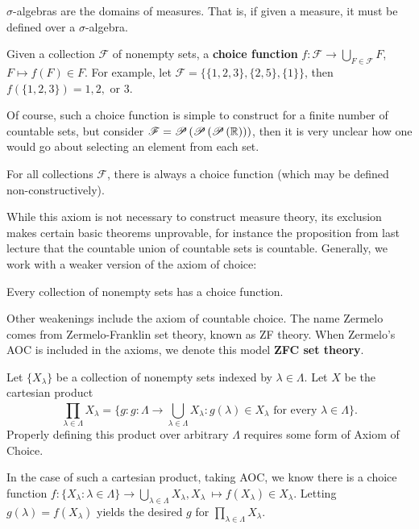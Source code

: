 \begin{remark}
	$\sigma$-algebras are the domains of measures. That is, if given a measure, it must be defined over a $\sigma$-algebra.
\end{remark}
\begin{definition}
	Given a collection $\mathscr{F}$ of nonempty sets, a \textbf{choice function}  $ f: \mathscr{F} \to \bigcup_{F \in \mathscr{F}}F $, $F \mapsto f(F) \in F $. For example, let $\mathscr{F}= \{\{1,2,3\}, \{2, 5\}, \{1\}\} $, then $f\left( \{1, 2, 3\}  \right) = 1, 2, \text{ or } 3$.
\end{definition}
Of course, such a choice function is simple to construct for a finite number of countable sets, but consider $\mathscr{F}= \mathscr{P}\left( \mathscr{P}\left( \mathscr{P}\left( \mathbb{R} \right)  \right)  \right) $, then it is very unclear how one would go about selecting an element from each set.
\begin{law}
	For all collections $\mathscr{F}$, there is always a choice function (which may be defined non-constructively).
\end{law}
While this axiom is not necessary to construct measure theory, its exclusion makes certain basic theorems unprovable, for instance the proposition from last lecture that the countable union of countable sets is countable. Generally, we work with a weaker version of the axiom of choice:
\begin{law}
Every collection of nonempty sets has a choice function.
\end{law}
Other weakenings include the axiom of countable choice. The name Zermelo comes from Zermelo-Franklin set theory, known as ZF theory. When Zermelo's AOC is included in the axioms, we denote this model \textbf{ZFC set theory}.
\begin{proposition}
	Let \(\{X_{\lambda}\} \) be a collection of nonempty sets indexed by \(\lambda \in \Lambda\). Let \(X\) be the cartesian product \[\prod_{\lambda \in \Lambda}^{}  X_{\lambda} = \{g : g: \Lambda \to \bigcup_{\lambda \in \Lambda} X_{\lambda}:g\left( \lambda \right) \in X_{\lambda} \text{ for every } \lambda \in \Lambda\} .\] Properly defining this product over arbitrary \(\Lambda\) requires some form of Axiom of Choice.
\end{proposition}
\begin{remark}
In the case of such a cartesian product, taking AOC, we know there is a choice function \(f: \{X_{\lambda}: \lambda \in \Lambda\}  \to \bigcup_{\lambda \in \Lambda} X_{\lambda} ,X_{\lambda} \  \mapsto f(X_{\lambda}) \in X_{\lambda}\). Letting \(g\left( \lambda \right) = f\left( X_{\lambda} \right) \) yields the desired \(g\) for \(\prod_{\lambda \in \Lambda}^{} X_{\lambda}\).
\end{remark}
